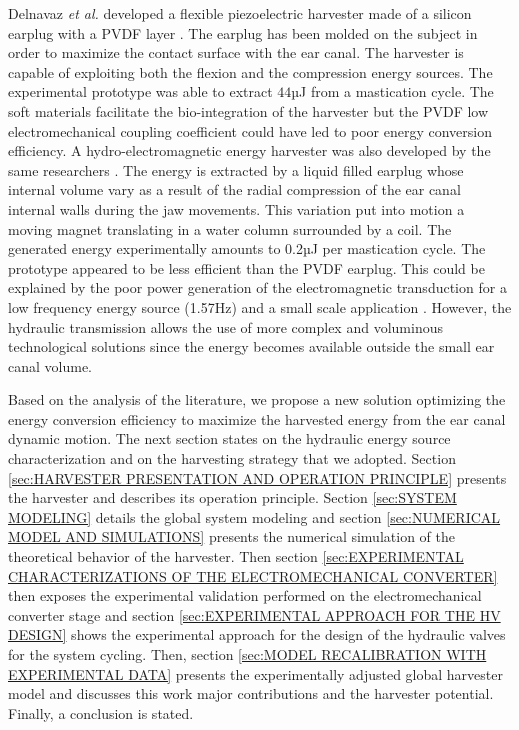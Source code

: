 \documentclass[3p,twocolumn,preprint]{elsarticle}
\begin{document}
Delnavaz \emph{et al.} developed a flexible piezoelectric harvester made of a silicon earplug with a PVDF layer \cite{Delnavaz2013}. The earplug has been molded on the subject in order to maximize the contact surface with the ear canal. The harvester is capable of exploiting both the flexion and the compression energy sources. The experimental prototype was able to extract $44$µJ from a mastication cycle. The soft materials facilitate the bio-integration of the harvester but the PVDF low electromechanical coupling coefficient could have led to poor energy conversion efficiency. A hydro-electromagnetic energy harvester was also developed by the same researchers \cite{Delnavaz2012}. The energy is extracted by a liquid filled earplug whose internal volume vary as a result of the radial compression of the ear canal internal walls during the jaw movements. This variation put into motion a moving magnet translating in a water column surrounded by a coil. The generated energy experimentally amounts to 0.2µJ per mastication cycle. The prototype appeared to be less efficient than the PVDF earplug. This could be explained by the poor power generation of the electromagnetic transduction for a low frequency energy source (1.57Hz) and a small scale application \cite{Kulah2008,Priya2017}. However, the hydraulic transmission allows the use of more complex and voluminous technological solutions since the energy becomes available outside the small ear canal volume.

Based on the analysis of the literature, we propose a new solution optimizing the energy conversion efficiency to maximize the harvested energy from the ear canal dynamic motion. The next section states on the hydraulic energy source characterization and on the harvesting strategy that we adopted. Section \ref{sec:HARVESTER PRESENTATION AND OPERATION PRINCIPLE} presents the harvester and describes its operation principle. Section \ref{sec:SYSTEM MODELING} details the global system modeling and section \ref{sec:NUMERICAL MODEL AND SIMULATIONS} presents the numerical simulation of the theoretical behavior of the harvester. Then section \ref{sec:EXPERIMENTAL CHARACTERIZATIONS OF THE ELECTROMECHANICAL CONVERTER} then exposes the experimental validation performed on the electromechanical converter stage and section \ref{sec:EXPERIMENTAL APPROACH FOR THE HV DESIGN} shows the experimental approach for the design of the hydraulic valves for the system cycling. Then, section \ref{sec:MODEL RECALIBRATION WITH EXPERIMENTAL DATA} presents the experimentally adjusted global harvester model and discusses this work major contributions and the harvester potential. Finally, a conclusion is stated.
\end{document}
